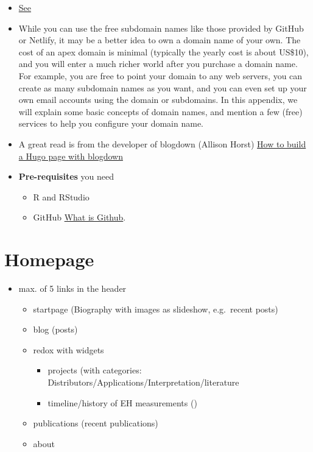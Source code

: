 \documentclass[
]{article}
\providecommand{\tightlist}{%
  \setlength{\itemsep}{0pt}\setlength{\parskip}{0pt}}
\begin{document}
\begin{itemize}
\item
  \href{https://bookdown.org/yihui/blogdown/domain-name.html\#domain-name}{See}
\item
  While you can use the free subdomain names like those provided by
  GitHub or Netlify, it may be a better idea to own a domain name of
  your own. The cost of an apex domain is minimal (typically the
  yearly cost is about US\$10), and you will enter a much richer world
  after you purchase a domain name. For example, you are free to point
  your domain to any web servers, you can create as many subdomain
  names as you want, and you can even set up your own email accounts
  using the domain or subdomains. In this appendix, we will explain
  some basic concepts of domain names, and mention a few (free)
  services to help you configure your domain name.
\item
  A great read is from the developer of blogdown (Allison Horst) \href{https://alison.rbind.io/post/new-year-new-blogdown/\#pre-requisites}{How
  to build a Hugo page with
  blogdown}
\item
  \textbf{Pre-requisites} you need

  \begin{itemize}
  \tightlist
  \item
    R and RStudio
  \item
    GitHub \href{https://happygitwithr.com/}{What is Github}.
  \end{itemize}
\end{itemize}

\hypertarget{homepage-2}{%
\section{Homepage}\label{homepage-2}}

\begin{itemize}
\item
  max. of 5 links in the header

  \begin{itemize}
  \item
    startpage (Biography with images as slideshow, e.g.~recent
    posts)
  \item
    blog (posts)
  \item
    redox with widgets

    \begin{itemize}
    \tightlist
    \item
      projects (with categories:
      Distributors/Applications/Interpretation/literature
    \item
      timeline/history of EH measurements ()
    \end{itemize}
  \item
    publications (recent publications)
  \item
    about
  \end{itemize}
\end{itemize}
\end{document}
